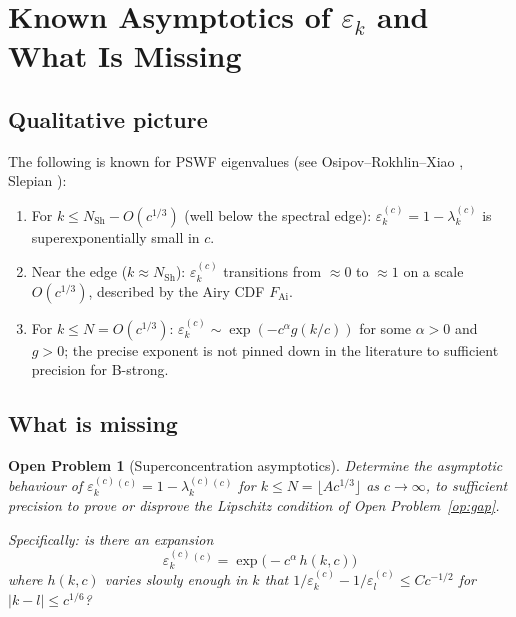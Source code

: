 \documentclass[12pt,a4paper]{article}
\newtheorem{openproblem}[theorem]{Open Problem}
\newcommand{\lam}[1]{\lambda_{#1}^{(c)}}
\newcommand{\eps}[1]{\varepsilon_{#1}^{(c)}}
\begin{document}
\section{Known Asymptotics of $\varepsilon_k$ and What Is Missing}
\label{sec:asymptotics}

\subsection{Qualitative picture}

The following is known for PSWF eigenvalues
(see Osipov--Rokhlin--Xiao \cite{ORX2013},
Slepian \cite{Slepian1978}):
\begin{enumerate}[nosep]
  \item For $k \leq N_{\mathrm{Sh}} - O(c^{1/3})$
        (well below the spectral edge):
        $\eps{k} = 1 - \lam{k}$ is superexponentially
        small in $c$.
  \item Near the edge ($k \approx N_{\mathrm{Sh}}$):
        $\eps{k}$ transitions from $\approx 0$ to
        $\approx 1$ on a scale $O(c^{1/3})$,
        described by the Airy CDF $F_{\mathrm{Ai}}$.
  \item For $k \leq N = O(c^{1/3})$:
        $\eps{k} \sim \exp(-c^\alpha g(k/c))$
        for some $\alpha > 0$ and $g > 0$;
        the precise exponent is not pinned down
        in the literature to sufficient precision for B-strong.
\end{enumerate}

\subsection{What is missing}

\begin{openproblem}[Superconcentration asymptotics]
\label{op:asymptotics}
Determine the asymptotic behaviour of
$\eps{k}^{(c)} = 1 - \lam{k}^{(c)}$
for $k \leq N = \lfloor Ac^{1/3}\rfloor$
as $c \to \infty$, to sufficient precision to prove
or disprove the Lipschitz condition of
Open Problem~\ref{op:gap}.

\medskip\noindent
Specifically: is there an expansion
\[
  \eps{k}^{(c)} = \exp\!\bigl(-c^{\alpha}\,h(k, c)\bigr)
\]
where $h(k,c)$ varies slowly enough in $k$ that
$1/\eps{k} - 1/\eps{l} \leq Cc^{-1/2}$
for $|k-l| \leq c^{1/6}$?
\end{openproblem}
\end{document}
